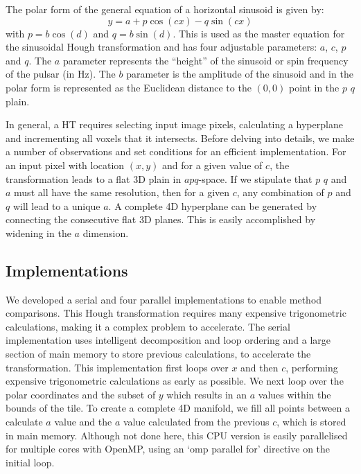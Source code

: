 \documentclass[11pt,twoside]{article}
\begin{document}
The polar form of the general equation of a horizontal sinusoid is given by:
\begin{equation} \label{eq:masterPolar}
y = a + p \cos\left(cx\right) - q \sin \left( cx \right ) 
\end{equation}
with $ p = b \cos\left(d\right)$ and $ q =b \sin \left( d \right)$.
This is used as the master equation for the sinusoidal Hough transformation and has four adjustable parameters: $a$, $c$, $p$ and $q$.
The $a$ parameter represents the ``height'' of the sinusoid or spin frequency of the pulsar (in Hz).  
The $b$ parameter is the amplitude of the sinusoid and in the polar form is represented as the Euclidean distance to the $(0,0)$ point in the $p$ $q$ plain.

In general, a HT requires selecting input image pixels, calculating a hyperplane and incrementing all voxels that it intersects.
Before delving into details, we make a number of observations and set conditions for an efficient implementation.
For an input pixel with location $(x, y)$ and for a given value of $c$, the transformation leads to a flat 3D plain in $apq$-space.
If we stipulate that $p$ $q$ and $a$ must all have the same resolution, then for a given $c$, any combination of $p$ and $q$ will lead to a unique $a$.
A complete 4D hyperplane can be generated by connecting the consecutive flat 3D planes.
This is easily accomplished by widening in the $a$ dimension.

\subsection{Implementations}

We developed a serial and four parallel implementations to enable method comparisons.
This Hough transformation requires many expensive trigonometric calculations, making it a complex problem to accelerate.
The serial implementation uses intelligent decomposition and loop ordering and a large section of main memory to store previous calculations, to accelerate the transformation.
This implementation first loops over $x$ and then $c$, performing expensive trigonometric calculations as early as possible.
We next loop over the polar coordinates and the subset of $y$ which results in an $a$ values within the bounds of the tile.
To create a complete 4D manifold, we fill all points between a calculate $a$ value and the $a$ value calculated from the previous $c$, which is stored in main memory.
Although not done here, this CPU version is easily parallelised for multiple cores with OpenMP, using an `omp parallel for' directive on the initial loop.
\end{document}
